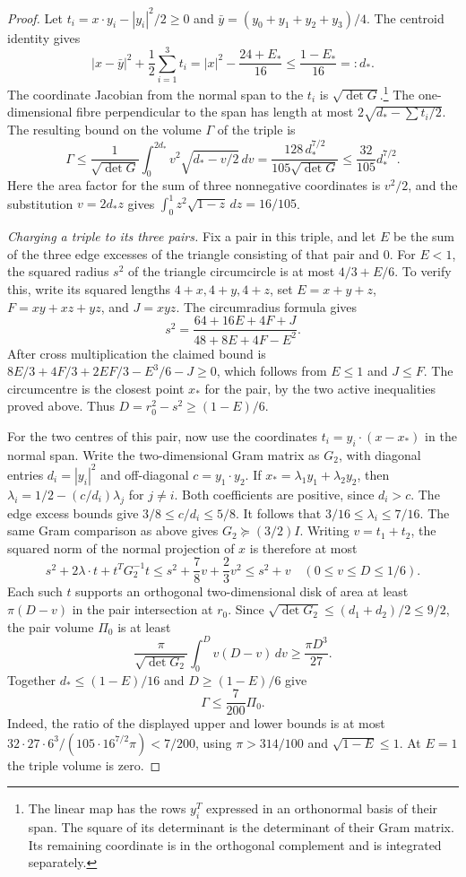 \begin{proof}
Let \(t_i=x\cdot y_i-|y_i|^2/2\ge0\) and
\(\bar y=(y_0+y_1+y_2+y_3)/4\). The centroid identity gives
\[
 |x-\bar y|^2+\frac12\sum_{i=1}^3t_i
 = |x|^2-\frac{24+E_*}{16}\le \frac{1-E_*}{16}=:d_* .
\]
The coordinate Jacobian from the normal span to the \(t_i\)
is \(\sqrt{\det G}\).\footnote{The linear map has the rows
\(y_i^T\) expressed in an orthonormal basis of their span.
The square of its determinant is the determinant of their
Gram matrix. Its remaining coordinate is in the orthogonal
complement and is integrated separately.}
The one-dimensional fibre perpendicular to the span has
length at most \(2\sqrt{d_*-\sum t_i/2}\).
The resulting bound on the volume \(\Gamma\) of the triple is
\[
 \Gamma\le
 \frac{1}{\sqrt{\det G}}\int_0^{2d_*}
       v^2\sqrt{d_*-v/2}\,dv
 =\frac{128\,d_*^{7/2}}{105\sqrt{\det G}}
 \le\frac{32}{105}d_*^{7/2}.
\]
Here the area factor for the sum of three nonnegative
coordinates is \(v^2/2\), and the substitution
\(v=2d_*z\) gives
\(\int_0^1 z^2\sqrt{1-z}\,dz=16/105\).

\emph{Charging a triple to its three pairs.}
Fix a pair in this triple, and let \(E\) be the sum of the
three edge excesses of the triangle consisting of that pair
and \(0\). For \(E<1\), the squared radius \(s^2\) of the
triangle circumcircle is at most \(4/3+E/6\). To verify this,
write its squared lengths \(4+x,4+y,4+z\), set
\(E=x+y+z\), \(F=xy+xz+yz\), and \(J=xyz\). The circumradius
formula gives
\[
 s^2=\frac{64+16E+4F+J}{48+8E+4F-E^2}.
\]
After cross multiplication the claimed bound is
\(8E/3+4F/3+2EF/3-E^3/6-J\ge0\), which follows from
\(E\le1\) and \(J\le F\).
The circumcentre is the closest point \(x_*\) for the pair,
by the two active inequalities proved above. Thus
\(D=r_0^2-s^2\ge(1-E)/6\).

For the two centres of this pair, now use the coordinates
\(t_i=y_i\cdot(x-x_*)\) in the normal span. Write the
two-dimensional Gram matrix as \(G_2\), with diagonal
entries \(d_i=|y_i|^2\) and off-diagonal \(c=y_1\cdot y_2\).
If \(x_*=\lambda_1 y_1+\lambda_2 y_2\), then
\(\lambda_i=1/2-(c/d_i)\lambda_j\) for \(j\ne i\).
Both coefficients are positive, since \(d_i>c\).
The edge excess bounds give \(3/8\le c/d_i\le5/8\).
It follows that \(3/16\le\lambda_i\le7/16\).
The same Gram comparison as above gives \(G_2\succeq (3/2)I\).
Writing \(v=t_1+t_2\), the squared norm of the normal
projection of \(x\) is therefore at most
\[
 s^2+2\lambda\cdot t+t^TG_2^{-1}t
 \le s^2+\frac78v+\frac23v^2\le s^2+v
 \quad(0\le v\le D\le1/6).
\]
Each such \(t\) supports an orthogonal two-dimensional disk
of area at least \(\pi(D-v)\) in the pair intersection at \(r_0\).
Since \(\sqrt{\det G_2}\le(d_1+d_2)/2\le9/2\), the pair
volume \(\Pi_0\) is at least
\[
 \frac{\pi}{\sqrt{\det G_2}}\int_0^D v(D-v)\,dv
 \ge \frac{\pi D^3}{27}.
\]
Together \(d_*\le(1-E)/16\) and \(D\ge(1-E)/6\) give
\[
 \Gamma\le\frac7{200}\Pi_0 .
\]
Indeed, the ratio of the displayed upper and lower bounds
is at most
\(32\cdot27\cdot6^3/(105\cdot16^{7/2}\pi)<7/200\),
using \(\pi>314/100\) and \(\sqrt{1-E}\le1\).
At \(E=1\) the triple volume is zero.


\end{proof}
